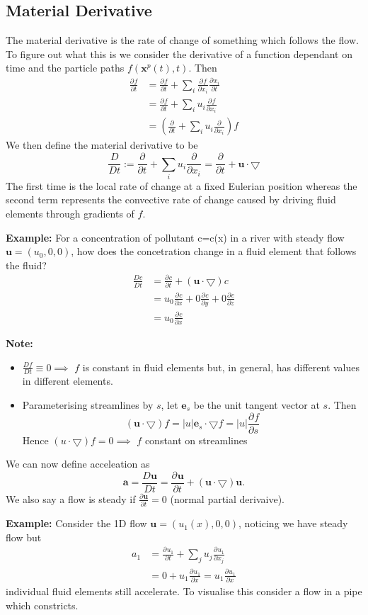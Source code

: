 \documentclass[11pt]{article}
\newcommand*{\pd}[3][]{\ensuremath{\frac{\partial^{#1} {#2}}{\partial {#3}^{#1}}}}
\newcommand*{\md}[1]{\ensuremath{\frac{D #1}{D t}}}
\newcommand{\grad}{\bigtriangledown}
\newcommand{\defeq}{:=}
\newcommand{\mv}[1]{\bm{#1}}
\newcommand{\mdf}[1]{{\color{red}#1}}
\newenvironment{eg}
{\begin{mdframed}[backgroundcolor=mylg, roundcorner=5pt, linewidth=0pt]\textbf{Example: }\normalfont}
    {\end{mdframed}}
\newenvironment{note}
    {\textbf{Note:}\begin{mdframed}[backgroundcolor=white, roundcorner=5pt, linewidth=0pt]}
    {\end{mdframed}}
\begin{document}
\subsection{Material Derivative}
The \mdf{material derivative} is the rate of change of something which follows the flow. To figure out what this is we consider the derivative of a function dependant on time and the particle paths $f(\mv{x}^p(t),t)$. Then
\begin{align*}
    \pd{f}{t}&=\pd{f}{t}+\sum_i \pd{f}{x_i}\pd{x_i}{t}\\
             &=\pd{f}{t}+\sum_i u_i\pd{f}{x_i}\\
             &=\left(\pd{ }{t} + \sum_i u_i\pd{ }{x_i}\right)f
\end{align*}
We then define the \mdf{material derivative} to be
$$\md{ }\defeq \pd{ }{t}+\sum_i u_i\pd{ }{x_i}=\pd{ }{t}+\mv{u}\cdot\grad$$
The first time is the local rate of change at a fixed Eulerian position whereas the second term represents the convective rate of change caused by driving fluid elements through gradients of $f$.
\begin{eg}
For a concentration of pollutant c=c(x) in a river with steady flow $\mv{u}=(u_0,0,0)$, how does the concetration change in a fluid element that follows the fluid?
\begin{align*}
    \md{c}&=\pd{c}{t}+(\mv{u}\cdot\grad)c\\
          &=u_0\pd{c}{x}+0\pd{c}{y}+0\pd{c}{z}\\
          &=u_0\pd{c}{x}
\end{align*}
\end{eg}
\begin{note}
\begin{itemize}
    \item $\md{f}\equiv 0 \implies$ $f$ is constant in fluid elements but, in general, has different values in different elements.
    \item Parameterising streamlines by $s$, let $\mv{e}_s$ be the unit tangent vector at $s$. Then
    $$(\mv{u}\cdot\grad) f= |u|\mv{e}_s\cdot\grad f=|u|\pd{f}{s}$$
    Hence $(u\cdot\grad)f = 0\implies$ $f$ constant on streamlines
\end{itemize}
\end{note}
We can now define \mdf{acceleation} as
$$\mv{a}=\md{\mv{u}}=\pd{\mv{u}}{t}+(\mv{u}\cdot\grad)\mv{u}.$$
We also say a flow is \mdf{steady} if $\pd{\mv{u}}{t}=0$ (normal partial derivaive).
\begin{eg}
Consider the 1D flow $\mv{u}=(u_1(x),0,0)$, noticing we have steady flow but
\begin{align*}
    a_1&=\pd{u_1}{t}+\sum_j u_j\pd{u_1}{x_j}\\
       &= 0 + u_1 \pd{u_1}{x} = u_1 \pd{u_1}{x}
\end{align*}
individual fluid elements still accelerate. To visualise this consider a flow in a pipe which constricts.
\end{eg}
\end{document}
